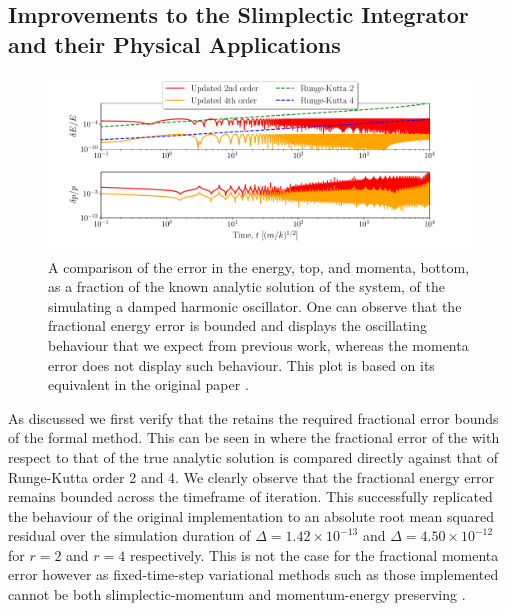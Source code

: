\subsection{Improvements to the Slimplectic Integrator and their Physical Applications}
\label{sec:results-si}

\begin{figure}[t]
  \includegraphics[width=\columnwidth]{figures/dho_energy_momenta_fractional_err.pdf}
  \caption{A comparison of the error in the energy, top, and momenta, bottom, as a fraction of the known analytic solution of the system, of the \updimpl{} simulating a damped harmonic oscillator. One can observe that the fractional energy error is bounded and displays the oscillating behaviour that we expect from previous work, whereas the momenta error does not display such behaviour. This plot is based on its equivalent in the original paper \cite[Figure 2, bottom]{tsangSLIMPLECTICINTEGRATORSVARIATIONAL2015}.}
\label{fig:dho_energy_bounds}
\end{figure}

As discussed we first verify that the \updimpl{} retains the required fractional error bounds of the formal method. This can be seen in  where the fractional error of the \updimpl{} with respect to that of the true analytic solution is compared directly against that of Runge-Kutta order 2 and 4. We clearly observe that the fractional energy error remains bounded across the timeframe of iteration.
This successfully replicated the behaviour of the original implementation to an absolute root mean squared residual over the simulation duration of $\Delta = 1.42 \times 10^{-13}$ and $\Delta = 4.50 \times 10^{-12}$ for $r = 2$ and $r = 4$ respectively.
This is not the case for the fractional momenta error however as fixed-time-step variational methods such as those implemented cannot be both slimplectic-momentum and momentum-energy preserving \cite{zhongLiePoissonHamiltonJacobiTheory1988}.

